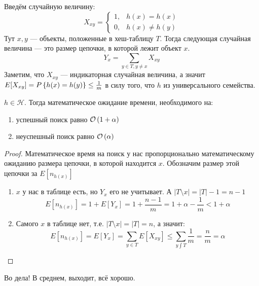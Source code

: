 Введём случайную величину:
\[ 
    X_{xy} = \begin{cases} 1, &h(x) = h(x)\\ 0, &h(x) \neq h(y) \end{cases}
\]
Тут $x, y$ --- объекты, положенные в хеш-таблицу $T$. Тогда следующая случайная величина --- это размер цепочки, в которой лежит объект $x$.
\[
    Y_x = \sum_{y \in T, y \neq x}{X_{xy}}
\]
Заметим, что $X_{xy}$ --- индикаторная случайная величина, а значит $E[X_{xy}] = P\left\lbrace h(x)=h(y) \right\rbrace \leq \frac{1}{m}$ в силу того, что $h$ из универсального семейства.
\begin{thm}
$h \in \mathcal{H}$. Тогда математическое ожидание времени, необходимого на:
\begin{enumerate}
    \item успешный поиск равно $\mathcal{O}\left(1 + \alpha\right)$
    \item неуспешный поиск равно $\mathcal{O}\left(\alpha\right)$
\end{enumerate}
\end{thm}
\begin{proof}
Математическое время на поиск у нас пропорционально математическому ожиданию размера цепочки, в которой находится $x$. Обозначим размер этой цепочки за $E[n_{h(x)}]$
\begin{enumerate}
    \item $x$ у нас в таблице есть, но $Y_x$ его не учитывает. А $|T \setminus x| = |T| - 1 = n - 1$ 
    \[
        E[n_{h(x)}] = 1 + E[Y_x] = 1 + \frac{n - 1}{m} = 1 + \alpha - \frac{1}{m} < 1 + \alpha
    \]
    \item Самого $x$ в таблице нет, т.е. $|T \setminus x| = |T| = n$, а значит:
    \[
        E[n_{h(x)}] = E[Y_x] = \sum_{y\in T}{E[X_{xy}]} \leq \sum_{y \int T}{\frac{1}{m}} = \frac{n}{m} = \alpha 
    \]
\end{enumerate}
\end{proof}
Во дела! В среднем, выходит, всё хорошо.

